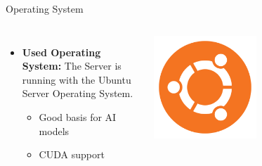 \documentclass{beamer}
\begin{document}
\begin{frame}{Operating System}
  \begin{columns}
      \begin{itemize}
        \item \textbf{Used Operating System:} The Server is running with the Ubuntu Server Operating System. 
        \begin{itemize}
          \item Good basis for AI models
          \item CUDA support
        \end{itemize}
      \end{itemize}
      \centering
      \includegraphics[width=0.5\textwidth]{Ubuntu.png}
  \end{columns}
\end{frame}
\end{document}
